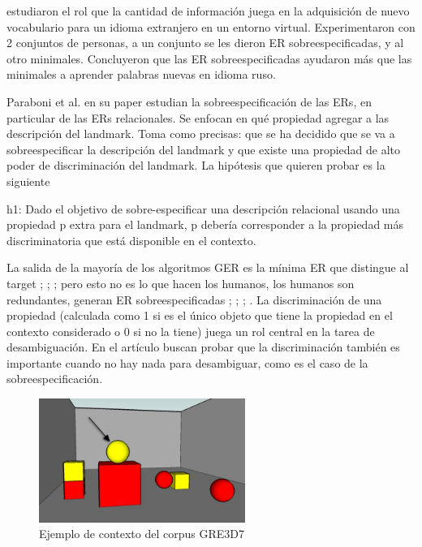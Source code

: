 \cite{Lu_sasha2015} estudiaron el rol que la cantidad de informaci\'on juega en la adquisici\'on de nuevo vocabulario para un idioma extranjero en un entorno virtual. Experimentaron con 2 conjuntos de personas, a un conjunto se les dieron ER sobreespecificadas, y al otro minimales. Concluyeron que las ER sobreespecificadas ayudaron m\'as que las minimales a aprender palabras nuevas en idioma ruso.


Paraboni et al. en su paper \cite{acl-Paraboni15} estudian la sobreespecificaci\'on de las ERs, en particular de las ERs relacionales.
  Se enfocan en qu\'e propiedad agregar a las descripci\'on del landmark. Toma como precisas:
que se ha decidido que se va a sobreespecificar la descripci\'on del landmark
y que existe una propiedad de alto poder de discriminaci\'on del landmark.
La hip\'otesis que quieren probar es la siguiente

\begin{displayquote}h1: Dado el objetivo de sobre-especificar una descripci\'on relacional usando una propiedad p extra para el landmark, p deber\'ia corresponder a la propiedad m\'as discriminatoria que est\'a disponible en el contexto. 
\end{displayquote}
La salida de la mayor\'ia de los algoritmos GER es la m\'inima ER que distingue al target ; ; ; pero esto no es lo que hacen los humanos, los humanos son redundantes, generan ER sobreespecificadas ; ; ; . La discriminaci\'on de una propiedad (calculada como 1 si es el \'unico objeto que tiene la propiedad en el contexto considerado o 0 si no la tiene) juega un rol central en la tarea de desambiguaci\'on. En el art\'iculo buscan probar que la discriminaci\'on tambi\'en es importante cuando no hay nada para desambiguar, como es el caso de la sobreespecificaci\'on.




\begin{figure}[ht]
\centering
\includegraphics[width=0.6\textwidth]{images/7.jpg}
\caption{Ejemplo de contexto del corpus GRE3D7}
\label{GRE3D7-stimulus7}
\end{figure}

